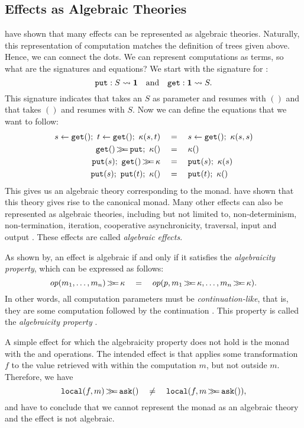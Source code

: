 \subsection{Effects as Algebraic Theories}

\textcite{goos_adequacy_2001} have shown that many effects can be represented as algebraic theories.
Naturally, this representation of computation matches the definition of trees given above. Hence, we can connect the dots. We can represent computations as terms, so what are the signatures and equations? We start with the signature for :
\[
    \mathtt{put} : S \rightsquigarrow \mathbf{1}
    \quad\text{and}\quad
    \mathtt{get} : \mathbf{1} \rightsquigarrow S.
\]
This signature indicates that \oput takes an $S$ as parameter and resumes with $()$ and that \oget takes $()$ and resumes with $S$. Now we can define the equations that we want  to follow:
\begin{align*}
    s \gets \mathtt{get}() ;\  t \gets \mathtt{get}() ;\  \kappa(s,t)
        &\quad=\quad s \gets \mathtt{get}();\  \kappa(s, s) \\
    \mathtt{get}()\operatorname{\mathtt{\gg\!\!=}} \mathtt{put};\  \kappa() &\quad=\quad \kappa () \\
    \mathtt{put}(s);\  \mathtt{get}()\operatorname{\mathtt{\gg\!\!=}} \kappa &\quad=\quad \mathtt{put}(s);\  \kappa(s) \\
    \mathtt{put}(s);\  \mathtt{put}(t);\  \kappa() &\quad=\quad \mathtt{put}(t);\  \kappa()
\end{align*}
This gives us an algebraic theory corresponding to the  monad. \textcite{goos_adequacy_2001} have shown that this theory gives rise to the canonical  monad. Many other effects can also be represented as algebraic theories, including but not limited to, non-determinism, non-termination, iteration, cooperative asynchronicity, traversal, input and output \citationneeded{}. These effects are called \emph{algebraic effects}.

As shown by\textcite{plotkin_algebraic_2003},  an effect is algebraic if and only if it satisfies the \emph{algebraicity property}, which can be expressed as follows:
\[
    op(m_1, \dots, m_n) \operatorname{\mathtt{\gg\!\!=}} \kappa \quad=\quad op(p, m_1\operatorname{\mathtt{\gg\!\!=}} \kappa, \dots, m_n\operatorname{\mathtt{\gg\!\!=}}\kappa).
\]
In other words, all computation parameters must be \emph{continuation-like}, that is, they are some computation followed by the continuation \autocite{bach_poulsen_hefty_2023}. This property is called the \emph{algebraicity property} \autocite{plotkin_algebraic_2003}.

A simple effect for which the algebraicity property does not hold is the  monad with the \olocal and \oask operations. The intended effect is that \olocal applies some transformation $f$ to the value retrieved with \oask within the computation $m$, but not outside $m$. Therefore, we have
\[
    \mathtt{local}(f, m) \operatorname{\mathtt{\gg\!\!=}} \mathtt{ask}() \quad\neq\quad \mathtt{local}(f, m \operatorname{\mathtt{\gg\!\!=}} \mathtt{ask}()),
\]
and have to conclude that we cannot represent the  monad as an algebraic theory and the effect is not algebraic.

